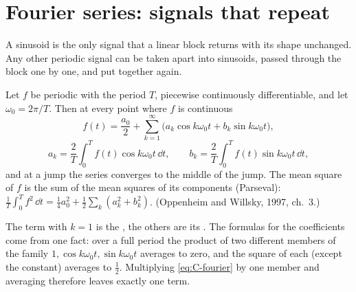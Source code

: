 \section{Fourier series: signals that repeat}

A sinusoid is the only signal that a linear block returns with its shape unchanged. Any other periodic signal can be taken apart into sinusoids, passed through the block one by one, and put together again.

\begin{theorem}
\label{thm:C-fourier}
Let $f$ be periodic with the period $T$, piecewise continuously differentiable, and let $\omega_0 = 2\pi/T$. Then at every point where $f$ is continuous
\begin{equation}\label{eq:C-fourier}
  f(t) = \frac{a_0}{2} + \sum_{k=1}^{\infty}\big(a_k\cos k\omega_0t + b_k\sin k\omega_0t\big),
\end{equation}
\begin{equation*}
  a_k = \frac{2}{T}\int_0^T f(t)\cos k\omega_0t\,\dd t, \qquad b_k = \frac{2}{T}\int_0^T f(t)\sin k\omega_0t\,\dd t ,
\end{equation*}
and at a jump the series converges to the middle of the jump. The mean square of $f$ is the sum of the mean squares of its components (Parseval): $\frac1T\int_0^T f^2\,\dd t = \tfrac14a_0^2 + \tfrac12\sum_k(a_k^2 + b_k^2)$. (Oppenheim and Willsky, 1997, ch.~3.)
\end{theorem}

The term with $k = 1$ is the , the others are its . The formulas for the coefficients come from one fact: over a full period the product of two different members of the family $1, \cos k\omega_0t, \sin k\omega_0t$ averages to zero, and the square of each (except the constant) averages to $\tfrac12$. Multiplying \cref{eq:C-fourier} by one member and averaging therefore leaves exactly one term.

